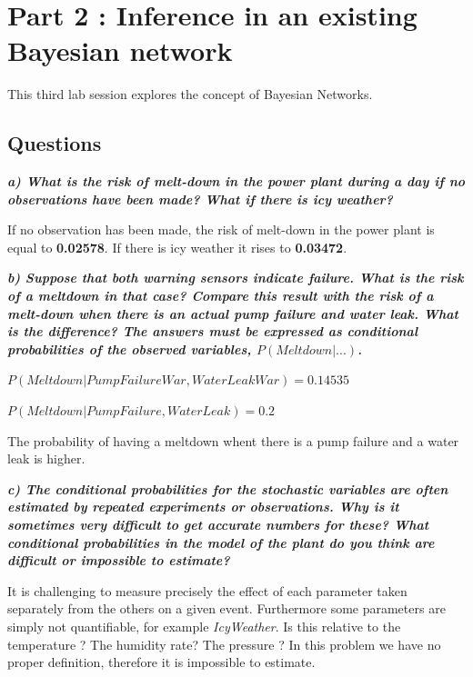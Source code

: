   \section*{Part 2 : Inference in an existing Bayesian network}

 \thispagestyle{empty}

This third lab session explores the concept of Bayesian Networks.

\subsection*{Questions}


\textit{\textbf{a) What is the risk of melt-down in the power plant during a day if no
observations have been made? What if there is icy weather?}}

\vspace{1em}

If no observation has been made, the risk of melt-down in the power plant is
equal to \textbf{0.02578}. If there is icy weather it rises to \textbf{0.03472}.

\textit{\textbf{b) Suppose that both warning sensors indicate failure. What is the risk
of a meltdown in that case? Compare this result with the risk of a melt-down
when there is an actual pump failure and water leak. What is the difference?
The answers must be expressed as conditional probabilities of the observed
variables, $P(Meltdown|...)$.}}

\vspace{1em}

$P(Meltdown| PumpFailureWar,WaterLeakWar) = 0.14535$

$P(Meltdown| PumpFailure,WaterLeak) = 0.2$

The probability of having a meltdown whent there is a pump failure and a water
leak is higher.

\textit{\textbf{c) The conditional probabilities for the stochastic variables are often
estimated by repeated experiments or observations. Why is it sometimes very
difficult to get accurate numbers for these? What conditional probabilities
in the model of the plant do you think are difficult or impossible to estimate?}}

\vspace{1em}


It is challenging to measure precisely the effect of each parameter taken separately
from the others on a given event. Furthermore some parameters are simply not
quantifiable, for example \textit{IcyWeather}. Is this relative to the temperature ?
The humidity rate? The pressure ? In this problem we have no proper definition,
therefore it is impossible to estimate.

